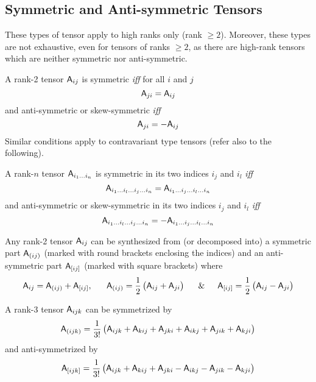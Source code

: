 \subsection{Symmetric and Anti-symmetric Tensors}

 These types of tensor apply to high ranks only (rank $\ge2$).
Moreover, these types are not exhaustive, even for tensors of ranks
$\ge2$, as there are high-rank tensors which are neither symmetric
nor anti-symmetric.

 A rank-2 tensor $\mathsf{A}_{ij}$ is symmetric \textit{iff }for
all $i$ and $j$
\begin{equation}
\mathsf{A}_{ji}=\mathsf{A}_{ij}
\end{equation}
and anti-symmetric or skew-symmetric \textit{iff}
\begin{equation}
\mathsf{A}_{ji}=-\mathsf{A}_{ij}
\end{equation}
Similar conditions apply to contravariant type tensors (refer also
to the following).

 A rank-$n$ tensor $\mathsf{A}_{i_{1}\ldots i_{n}}$ is symmetric
in its two indices $i_{j}$ and $i_{l}$ \textit{iff}
\begin{equation}
\mathsf{A}_{i_{1}\ldots i_{l}\ldots i_{j}\ldots i_{n}}=\mathsf{A}_{i_{1}\ldots i_{j}\ldots i_{l}\ldots i_{n}}
\end{equation}
and anti-symmetric or skew-symmetric in its two indices $i_{j}$ and
$i_{l}$ \textit{iff}
\begin{equation}
\mathsf{A}_{i_{1}\ldots i_{l}\ldots i_{j}\ldots i_{n}}=-\mathsf{A}_{i_{1}\ldots i_{j}\ldots i_{l}\ldots i_{n}}
\end{equation}


 Any rank-2 tensor $\mathsf{A}_{ij}$ can be synthesized from (or
decomposed into) a symmetric part $\mathsf{A}_{(ij)}$ (marked with round brackets
enclosing the indices) and an anti-symmetric part $\mathsf{A}_{[ij]}$ (marked
with square brackets) where
\begin{equation}
\mathsf{A}_{ij}=\mathsf{A}_{(ij)}+\mathsf{A}_{[ij]},\,\,\,\,\,\,\,\,\,\,\mathsf{A}_{(ij)}=\dfrac{1}{2}\left(\mathsf{A}_{ij}+\mathsf{A}_{ji}\right)\,\,\,\,\,\,\,\,\,\&\,\,\,\,\,\,\,\,\,\mathsf{A}_{[ij]}=\dfrac{1}{2}\left(\mathsf{A}_{ij}-\mathsf{A}_{ji}\right)
\end{equation}


 A rank-3 tensor $\mathsf{A}_{ijk}$ can be symmetrized by
\begin{equation}
\mathsf{A}_{(ijk)}=\dfrac{1}{3!}\left(\mathsf{A}_{ijk}+\mathsf{A}_{kij}+\mathsf{A}_{jki}+\mathsf{A}_{ikj}+\mathsf{A}_{jik}+\mathsf{A}_{kji}\right)
\end{equation}
and anti-symmetrized by
\begin{equation}
\mathsf{A}_{[ijk]}=\dfrac{1}{3!}\left(\mathsf{A}_{ijk}+\mathsf{A}_{kij}+\mathsf{A}_{jki}-\mathsf{A}_{ikj}-\mathsf{A}_{jik}-\mathsf{A}_{kji}\right)
\end{equation}


